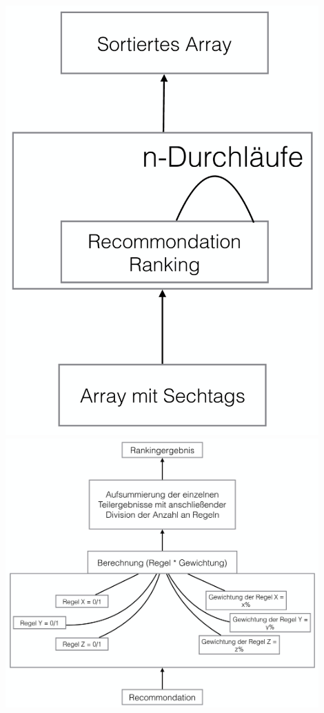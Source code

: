 \documentclass[a4paper,12pt]{article}
\begin{document}
\includegraphics[width=12cm]{Pics/rankinguebersicht}
\newpage
\includegraphics[width=12cm]{Pics/Ranking_Detail}
\end{document}
